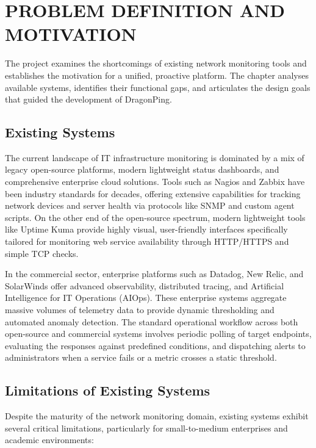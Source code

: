 \documentclass[12pt,a4paper,oneside]{report}
\begin{document}
\chapter{PROBLEM DEFINITION AND MOTIVATION}

The project examines the shortcomings of existing network monitoring tools and establishes the motivation for a unified, proactive platform. The chapter analyses available systems, identifies their functional gaps, and articulates the design goals that guided the development of DragonPing.

\section{Existing Systems}
\noindent The current landscape of IT infrastructure monitoring is dominated by a mix of legacy open-source platforms, modern lightweight status dashboards, and comprehensive enterprise cloud solutions. Tools such as Nagios and Zabbix have been industry standards for decades, offering extensive capabilities for tracking network devices and server health via protocols like SNMP and custom agent scripts. On the other end of the open-source spectrum, modern lightweight tools like Uptime Kuma provide highly visual, user-friendly interfaces specifically tailored for monitoring web service availability through HTTP/HTTPS and simple TCP checks.

\noindent In the commercial sector, enterprise platforms such as Datadog, New Relic, and SolarWinds offer advanced observability, distributed tracing, and Artificial Intelligence for IT Operations (AIOps). These enterprise systems aggregate massive volumes of telemetry data to provide dynamic thresholding and automated anomaly detection. The standard operational workflow across both open-source and commercial systems involves periodic polling of target endpoints, evaluating the responses against predefined conditions, and dispatching alerts to administrators when a service fails or a metric crosses a static threshold.

\section{Limitations of Existing Systems}
\noindent Despite the maturity of the network monitoring domain, existing systems exhibit several critical limitations, particularly for small-to-medium enterprises and academic environments:
\end{document}
